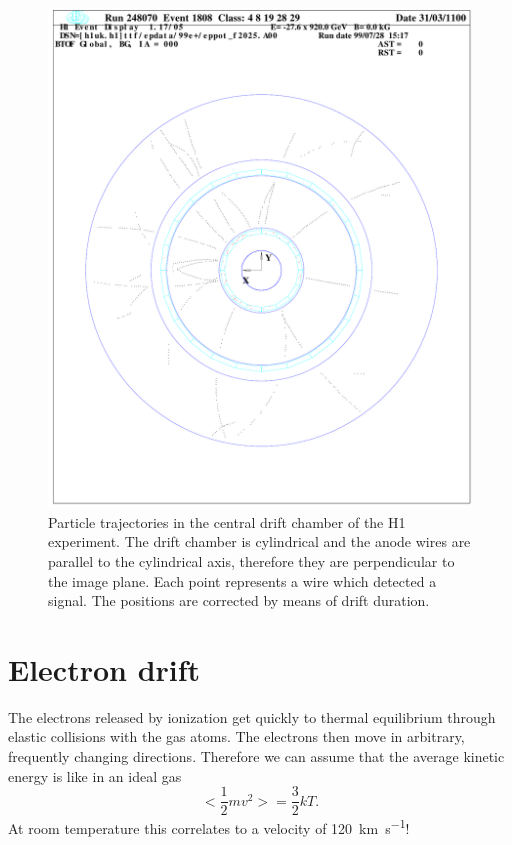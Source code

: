 \documentclass[12pt]{article}
\begin{document}
\begin{figure}[!h]
\includegraphics[width=13cm]{pics/H1-eps-converted-to.pdf}
\centering
\caption{Particle trajectories in the central drift chamber of the H1 experiment. The drift chamber is cylindrical and the anode wires are parallel to the cylindrical axis, therefore they are perpendicular to the image plane. Each point represents a wire which detected a signal. The positions are corrected by means of drift duration.}
\label{fig:H1_detector}
\end{figure}

\section{Electron drift}

The electrons released by ionization get quickly to thermal equilibrium through elastic collisions with the gas atoms. The electrons then move in arbitrary, frequently changing directions. Therefore we can assume that the average kinetic energy is like in an ideal gas
\begin{equation}
< \frac{1}{2} m v^2 > = \frac{3}{2} k T.
\end{equation}
At room temperature this correlates to a velocity of \SI{120}{\kilo\meter\per\second}!
\end{document}
